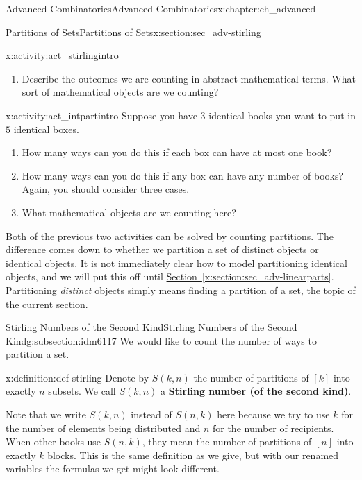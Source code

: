 \documentclass[oneside,10pt,]{book}
\newcommand{\terminology}[1]{\textbf{#1}}
\numberwithin{equation}{chapter}
\begin{document}
\begin{chapterptx}{Advanced Combinatorics}{}{Advanced Combinatorics}{}{}{x:chapter:ch_advanced}
\begin{sectionptx}{Partitions of Sets}{}{Partitions of Sets}{}{}{x:section:sec_adv-stirling}
\begin{introduction}{}
\begin{activity}{}{x:activity:act_stirlingintro}
\begin{enumerate}[font=\bfseries,label=(\alph*),ref=\alph*]
\item{}Describe the outcomes we are counting in abstract mathematical terms.  What sort of mathematical objects are we counting?%
\end{enumerate}
\end{activity}
\begin{activity}{}{x:activity:act_intpartintro}%
Suppose you have \(3\) identical books you want to put in \(5\) identical boxes.%
\begin{enumerate}[font=\bfseries,label=(\alph*),ref=\alph*]
\item{}How many ways can you do this if each box can have at most one book?%
\item{}How many ways can you do this if any box can have any number of books?  Again, you should consider three cases.%
\item{}What mathematical objects are we counting here?%
\end{enumerate}
\end{activity}
Both of the previous two activities can be solved by counting partitions.  The difference comes down to whether we partition a set of distinct objects or identical objects.  It is not immediately clear how to model partitioning identical objects, and we will put this off until \hyperref[x:section:sec_adv-linearparts]{Section~\ref{x:section:sec_adv-linearparts}}.  Partitioning \emph{distinct} objects simply means finding a partition of a set, the topic of the current section.%
\end{introduction}%
%
%
\typeout{************************************************}
\typeout{************************************************}
%
\begin{subsectionptx}{Stirling Numbers of the Second Kind}{}{Stirling Numbers of the Second Kind}{}{}{g:subsection:idm6117}
We would like to count the number of ways to partition a set.%
\begin{definition}{}{x:definition:def-stirling}%
Denote by \(S(k,n)\) the number of partitions of \([k]\) into exactly \(n\) subsets.  We call \(S(k,n)\) a \terminology{Stirling number (of the second kind)}.%
\end{definition}
Note that we write \(S(k,n)\) instead of \(S(n,k)\) here because we try to use \(k\) for the number of elements being distributed and \(n\) for the number of recipients.  When other books use \(S(n,k)\), they mean the number of partitions of \([n]\) into exactly \(k\) blocks.  This is the same definition as we give, but with our renamed variables the formulas we get might look different.%

\end{subsectionptx}
\end{sectionptx}
\end{chapterptx}
\end{document}
